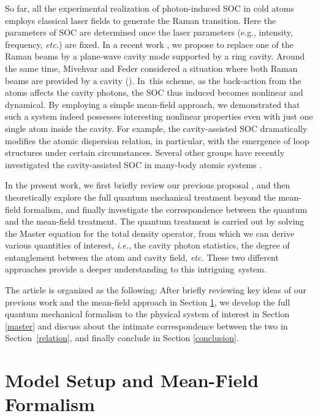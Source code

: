 \documentclass[atoms,article,accept,moreauthors,pdftex,12pt,a4paper]{mdpi}
\begin{document}
So far, all the experimental realization of photon-induced SOC in cold atoms employs classical laser fields to generate the Raman transition. Here the parameters of SOC are determined once the laser parameters (e.g., intensity, frequency, \emph{etc.}) are fixed. In a recent work \cite{cavitySOC}, we propose to replace one of the Raman beams by a plane-wave cavity mode supported by a ring cavity. Around the same time, Mivehvar and Feder considered a situation where both Raman beams are provided by a cavity (\cite{Feder}). In~this scheme, as the back-action from the atoms affects the cavity photons, the SOC thus induced becomes nonlinear and dynamical. By employing a simple mean-field approach, we demonstrated \cite{cavitySOC} that such a system indeed possesses interesting nonlinear properties even with just one single atom inside the cavity. For example, the cavity-assisted SOC dramatically modifies the atomic dispersion relation, in particular, with the emergence of loop structures under certain circumstances. Several other groups have recently investigated the cavity-assisted SOC in many-body atomic systems \cite{csoc1,csoc2,csoc3,csoc4}.

In the present work, we first briefly review our previous proposal \cite{cavitySOC}, and then theoretically explore the full quantum mechanical treatment beyond the mean-field formalism, and finally investigate the correspondence between the quantum and the mean-field treatment. The quantum treatment is carried out by solving the Master equation for the total density operator, from which we can derive various quantities of interest, \emph{i.e.}, the cavity photon statistics, the degree of entanglement between the atom and cavity field, \emph{etc.} These two different approaches provide a deeper understanding to this intriguing~system.

The article is organized as the following: After briefly reviewing key ideas of our previous work and the mean-field approach in Section \ref{meanfield}, we develop the full quantum mechanical formalism to the physical system of interest in Section \ref{master} and discuss about the intimate correspondence between the two in Section~\ref{relation}, and finally conclude in Section \ref{conclusion}.



\section{Model Setup and Mean-Field Formalism} \label{meanfield}
\end{document}
